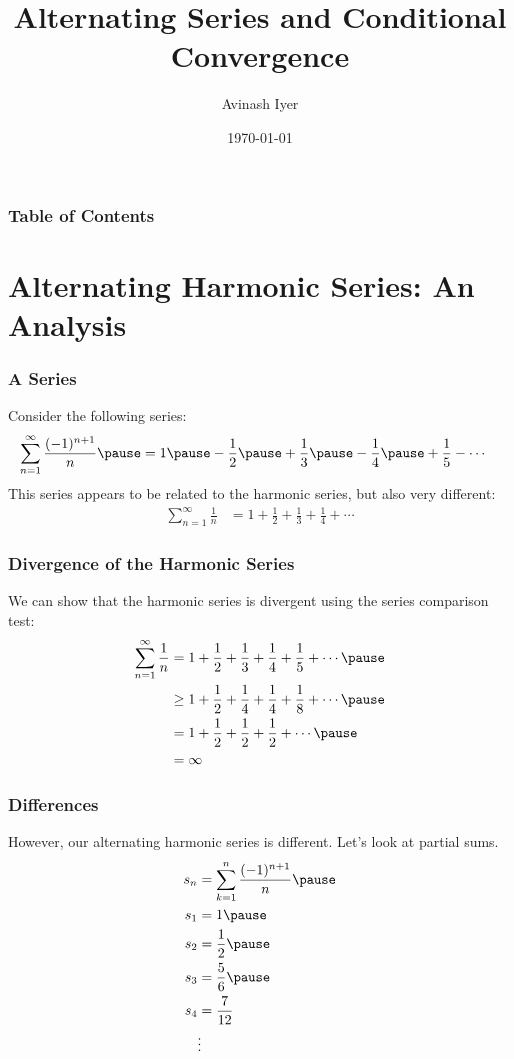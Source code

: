 \documentclass{beamer}
\title{Alternating Series and Conditional Convergence}
\author{Avinash Iyer}
\institute{Occidental College}
\date{\today} %
\begin{document}
\begin{frame}
    \titlepage
\end{frame}
\begin{frame}
  \frametitle{Table of Contents}
  \tableofcontents
\end{frame}
\section{Alternating Harmonic Series: An Analysis}
\begin{frame}
  \frametitle{A Series}
  Consider the following series: \pause
  \begin{align*}
    \sum_{n=1}^{\infty} \frac{(-1)^{n + 1}}{n} \pause &= 1 \pause - \frac{1}{2} \pause + \frac{1}{3}\pause - \frac{1}{4} \pause + \frac{1}{5} - \cdots
  \end{align*} \pause
  This series appears to be related to the harmonic series, but also very different:
  \begin{align*}
    \sum_{n=1}^{\infty}\frac{1}{n} &= 1 + \frac{1}{2} + \frac{1}{3} + \frac{1}{4} + \cdots \tag*{Harmonic Series}
  \end{align*}
\end{frame}
\begin{frame}
  \frametitle{Divergence of the Harmonic Series}
  We can show that the harmonic series is divergent using the series comparison test:
  \begin{align*}
    \sum_{n=1}^{\infty}\frac{1}{n} &= 1 + \frac{1}{2} + \frac{1}{3} + \frac{1}{4} + \frac{1}{5} + \cdots\pause\\
                                   &\geq 1 + \frac{1}{2} + \frac{1}{4} + \frac{1}{4} + \frac{1}{8} + \cdots\pause\\
                                   &= 1 + \frac{1}{2} + \frac{1}{2} + \frac{1}{2} + \cdots\pause\\
                                   &= \infty
  \end{align*}
\end{frame}
\begin{frame}
  \frametitle{Differences}
  However, our alternating harmonic series is different. Let's look at partial sums. \pause
  \begin{align*}
    s_{n} &= \sum_{k=1}^{n} \frac{(-1)^{n+1}}{n}\pause\\
    s_{1} &= 1\pause\\
    s_{2} &= \frac{1}{2}\pause\\
    s_{3} &= \frac{5}{6}\pause\\
    s_{4} &= \frac{7}{12}\\
          &\vdots
  \end{align*}
\end{frame}
\end{document}
